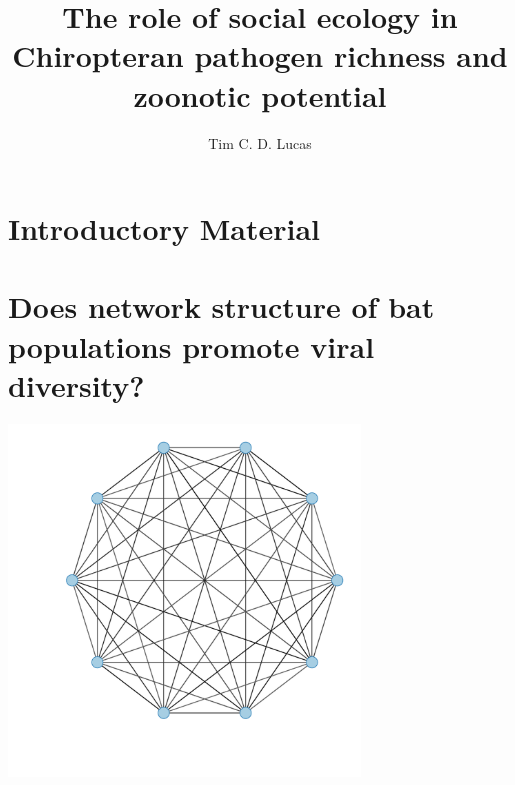 \documentclass[11pt,phd,a4paper,twoside]{PrettyStanley}
\title{The role of social ecology in Chiropteran pathogen richness and zoonotic potential}
\author{Tim C. D. Lucas}
\begin{document}
\color{prettytext}







\chapter{Introductory Material}
\label{chapterlabel1}




\chapter[Network structure and diversity]{Does network structure of bat populations promote viral diversity?}
\label{chapterlabel2}
\begin{center}
\includegraphics[width=0.7\textwidth]{imgs/fullyConnected.pdf}
\end{center}

\end{document}
